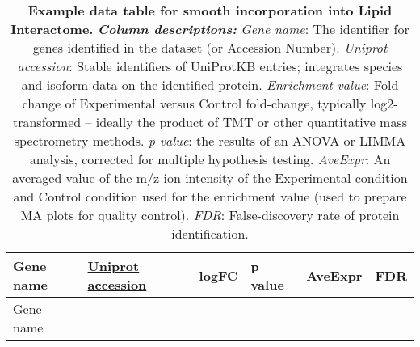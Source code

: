 \documentclass[
  letterpaper,
  DIV=11,
  numbers=noendperiod]{scrartcl}
\begin{document}
\begin{longtable}[]{@{}
  >{\raggedright\arraybackslash}p{}
  >{\centering\arraybackslash}p{}
  >{\centering\arraybackslash}p{}
  >{\centering\arraybackslash}p{}
  >{\centering\arraybackslash}p{}
  >{\centering\arraybackslash}p{}@{}}
\caption{\textbf{Example data table for smooth incorporation into Lipid
Interactome.} \textbf{\emph{Column descriptions:}} \emph{Gene name}: The
identifier for genes identified in the dataset (or Accession Number).
\emph{Uniprot accession}: Stable identifiers of UniProtKB entries;
integrates species and isoform data on the identified protein.
\emph{Enrichment value}: Fold change of Experimental versus Control
fold-change, typically log2-transformed -- ideally the product of TMT or
other quantitative mass spectrometry methods. \emph{p value}: the
results of an ANOVA or LIMMA analysis, corrected for multiple hypothesis
testing. \emph{AveExpr}: An averaged value of the m/z ion intensity of
the Experimental condition and Control condition used for the enrichment
value (used to prepare MA plots for quality control). \emph{FDR}:
False-discovery rate of protein
identification.}\label{tbl-1}\tabularnewline
\toprule\noalign{}
\begin{minipage}[b]{\linewidth}\raggedright
Gene name
\end{minipage} & \begin{minipage}[b]{\linewidth}\centering
\href{https://www.uniprot.org/help/accession_numbers}{Uniprot accession}
\end{minipage} & \begin{minipage}[b]{\linewidth}\centering
logFC
\end{minipage} & \begin{minipage}[b]{\linewidth}\centering
p value
\end{minipage} & \begin{minipage}[b]{\linewidth}\centering
AveExpr
\end{minipage} & \begin{minipage}[b]{\linewidth}\centering
FDR
\end{minipage} \\
\midrule\noalign{}
\endfirsthead
\toprule\noalign{}
\begin{minipage}[b]{\linewidth}\raggedright
Gene name
\end{minipage} & \begin{minipage}[b]{\linewidth}\centering

\end{minipage}
\end{longtable}
\end{document}
